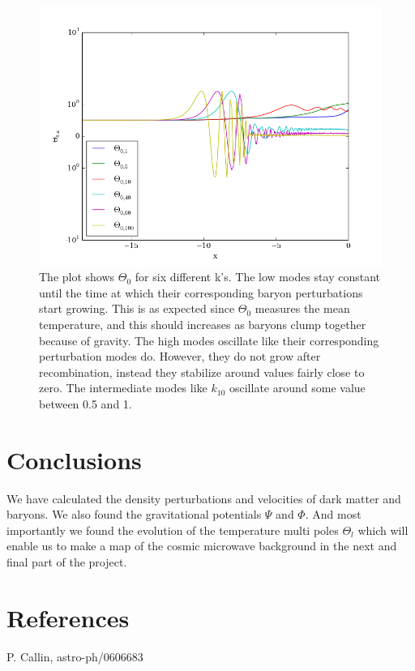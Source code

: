 \documentclass[a4paper]{report}
\begin{document}
\begin{figure}
 \includegraphics[width=\textwidth]{Theta0.png}
 \caption{The plot shows $\Theta_0$ for six different k's. The low modes stay constant until the time at which their corresponding baryon perturbations start growing. This is as expected since $\Theta_0$ measures the mean temperature, and this should increases as baryons clump together because of gravity. The high modes oscillate like their corresponding perturbation modes do. However, they do not grow after recombination, instead they stabilize around values fairly close to zero. The intermediate modes like $k_{10}$ oscillate around some value between 0.5 and 1.}
 \label{fig:Theta0}
\end{figure}





\section{Conclusions} \label{sec:conclusions}
We have calculated the density perturbations and velocities of dark matter and baryons. We also found the gravitational potentials $\Psi$ and $\Phi$. And most importantly we found the evolution of the temperature multi poles $\Theta_l$ which will enable us to make a map of the cosmic microwave background in the next and final part of the project.
\section{References}
\begin{enumerate}[label= {[}\arabic*{]} ]
 \item P. Callin, astro-ph/0606683
\end{enumerate}
\end{document}
